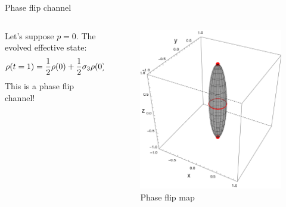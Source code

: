 \begin{frame}{Phase flip channel}
    \begin{columns}
        \begin{column}{0.5\textwidth}
            Let's suppose $p=0$. The evolved effective state:
            \begin{equation*}
              \rho(t=1)=\frac{1}{2}\rho(0)+\frac{1}{2}\sigma_{3}\rho(0)\sigma_{3}.
            \end{equation*}
            This is a phase flip channel!
        \end{column}
        \begin{column}{0.5\textwidth}
            \begin{figure}[h!]
                \centering
                \includegraphics[width=0.7\linewidth]{figures/sphere_PF_t=1.0_z=0.8_p=0.6.png}
                \caption{Phase flip map}
                \label{fig:SWAPFactor2D}
              \end{figure}
        \end{column}
    \end{columns}
\end{frame}

